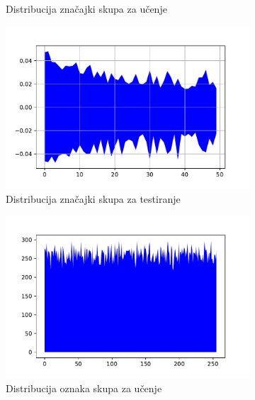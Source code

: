 \documentclass[times, utf8, numeric, diplomski]{fer}
\begin{document}
\begin{figure}[H]
\begin{subfigure}{.5\textwidth}
\centering
\caption{Distribucija značajki skupa za učenje}
\label{fig:dpa2_train_inputs}
\end{subfigure}
\begin{subfigure}{.5\textwidth}
\includegraphics[width=\textwidth]{nl256_ts_inputs.pdf}
\centering
\caption{Distribucija značajki skupa za testiranje}
\label{fig:dpa2_test_inputs}
\end{subfigure}
\begin{subfigure}{.5\textwidth}
\includegraphics[width=\textwidth]{nl256_tr_outputs.pdf}
\centering
\caption{Distribucija oznaka skupa za učenje}
\label{fig:dpa2_train_outputs}
\end{subfigure}
\begin{subfigure}{.5\textwidth}

\end{subfigure}
\end{figure}
\end{document}
